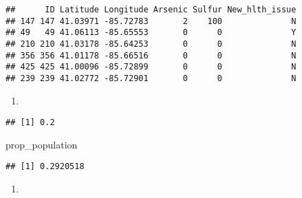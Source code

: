 \documentclass[
]{article}
\newenvironment{Shaded}{\begin{snugshade}}{\end{snugshade}}
\newcommand{\FunctionTok}[1]{\textcolor[rgb]{0.13,0.29,0.53}{\textbf{#1}}}
\newcommand{\NormalTok}[1]{#1}
\newcommand{\OtherTok}[1]{\textcolor[rgb]{0.56,0.35,0.01}{#1}}
\newcommand{\SpecialCharTok}[1]{\textcolor[rgb]{0.81,0.36,0.00}{\textbf{#1}}}
\newcommand{\StringTok}[1]{\textcolor[rgb]{0.31,0.60,0.02}{#1}}
\providecommand{\tightlist}{%
  \setlength{\itemsep}{0pt}\setlength{\parskip}{0pt}}
\begin{document}
\begin{verbatim}
##      ID Latitude Longitude Arsenic Sulfur New_hlth_issue
## 147 147 41.03971 -85.72783       2    100              N
## 49   49 41.06113 -85.65553       0      0              Y
## 210 210 41.03178 -85.64253       0      0              N
## 356 356 41.01178 -85.66516       0      0              N
## 425 425 41.00096 -85.72899       0      0              N
## 239 239 41.02772 -85.72901       0      0              N
\end{verbatim}

\begin{enumerate}
\def\labelenumi{(\alph{enumi})}
\setcounter{enumi}{2}
\tightlist
\item
\end{enumerate}

\begin{Shaded}
\end{Shaded}

\begin{verbatim}
## [1] 0.2
\end{verbatim}

\begin{Shaded}
\begin{Highlighting}[]
\NormalTok{prop\_population}
\end{Highlighting}
\end{Shaded}

\begin{verbatim}
## [1] 0.2920518
\end{verbatim}

\begin{enumerate}
\def\labelenumi{(\alph{enumi})}
\setcounter{enumi}{3}
\tightlist
\item
\end{enumerate}
\end{document}
